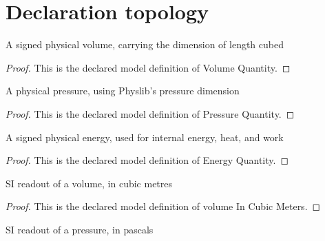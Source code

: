 \section{Declaration topology}
\begin{definition}
  \label{def:physics:phyx-mini-0352:phyxminiproblems-problemphyxmini0352-volumequantity}
  A signed physical volume, carrying the dimension of length cubed
\end{definition}
\begin{proof}
  This is the declared model definition of Volume Quantity.
\end{proof}
\begin{definition}
  \label{def:physics:phyx-mini-0352:phyxminiproblems-problemphyxmini0352-pressurequantity}
  A physical pressure, using Physlib's pressure dimension
\end{definition}
\begin{proof}
  This is the declared model definition of Pressure Quantity.
\end{proof}
\begin{definition}
  \label{def:physics:phyx-mini-0352:phyxminiproblems-problemphyxmini0352-energyquantity}
  A signed physical energy, used for internal energy, heat, and work
\end{definition}
\begin{proof}
  This is the declared model definition of Energy Quantity.
\end{proof}
\begin{definition}
  \label{def:physics:phyx-mini-0352:phyxminiproblems-problemphyxmini0352-volumeincubicmeters}
  SI readout of a volume, in cubic metres
\end{definition}
\begin{proof}
  This is the declared model definition of volume In Cubic Meters.
\end{proof}
\begin{definition}
  \label{def:physics:phyx-mini-0352:phyxminiproblems-problemphyxmini0352-pressureinpascals}
  SI readout of a pressure, in pascals
\end{definition}
